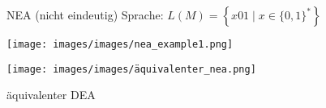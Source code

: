 \begin{example2}{NEA (nicht eindeutig)} Sprache: $L(M)=\left\{x 01 \mid x \in\{0,1\}^{*}\right\}$
    
    \begin{minipage}{0.5\linewidth}
        \texttt{[image: images/images/nea\_example1.png]}
    \end{minipage}
    \hspace{1mm}
    \begin{minipage}{0.5\linewidth}
        \begin{center}
        \texttt{[image: images/images/äquivalenter\_nea.png]}
        
        {\footnotesize äquivalenter DEA}
        \end{center}
    \end{minipage}    
\end{example2}



